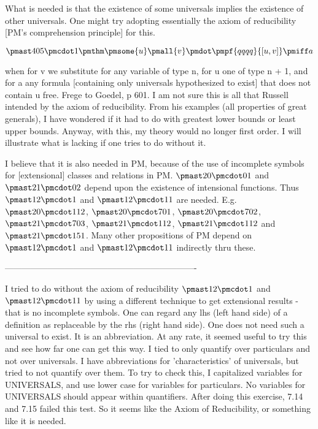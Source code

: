\documentclass[12pt]{article}
\begin{document}
What is needed is that the existence of some universals implies the existence of other universals. One might try adopting essentially the axiom of reducibility [PM's comprehension principle] for this.

$\pmast 405 \pmcdot 1 \pmthm \pmsome{u} \pmall{v} \pmdot \pmpf{qqqq}{[u,v]} \pmiff a$

when for v we substitute for any variable of type n, for u one of type n + 1, and for a any formula [containing only universals hypothesized to exist] that does not contain u free. Frege to Goedel, p 601. I am not sure this is all that Russell intended by the axiom of reducibility. From his examples (all properties of great generals), I have wondered if it had to do with  greatest lower bounds or least upper bounds. Anyway, with this, my theory would no longer first order. I will illustrate what is lacking if one tries to do without it.

I believe that it is also needed in PM, because of the use of incomplete symbols for [extensional] classes and relations in PM. $\pmast 20 \pmcdot 01$ and $\pmast 21 \pmcdot 02$ depend upon the existence of intensional functions. Thus $\pmast 12 \pmcdot 1$ and $\pmast 12 \pmcdot 11$ are needed. E.g. $\pmast 20 \pmcdot 112$,
$\pmast 20 \pmcdot 701$, $\pmast 20 \pmcdot 702$, $\pmast 21 \pmcdot 703$,
$\pmast 21 \pmcdot 112$, $\pmast 21 \pmcdot 112$ and $\pmast 21 \pmcdot 151$.
Many other propositions of PM depend on $\pmast 12 \pmcdot 1$ and
$\pmast 12 \pmcdot 11$ indirectly thru these.

-------------------------------------------------------------------

I tried to do without the axiom of reducibility $\pmast 12 \pmcdot 1$ and $\pmast 12 \pmcdot 11$ by using a different technique to get extensional results - that is no incomplete symbols. One can regard any lhs (left hand side) of a  definition as replaceable by the rhs (right hand side). One does not need such a universal to exist. It is an abbreviation. At any rate, it seemed useful to try this and see how far one can get this way. I tied to only quantify over particulars and not over universals. I have abbreviations for 'characteristics' of universals, but tried to not quantify over them. To try to check this, I capitalized variables for UNIVERSALS, and use lower case for variables for particulars. No variables for UNIVERSALS should appear within quantifiers. After doing this exercise, 7.14 and 7.15 failed this test. So it seems like the Axiom of Reducibility, or something like it is needed.
\end{document}
